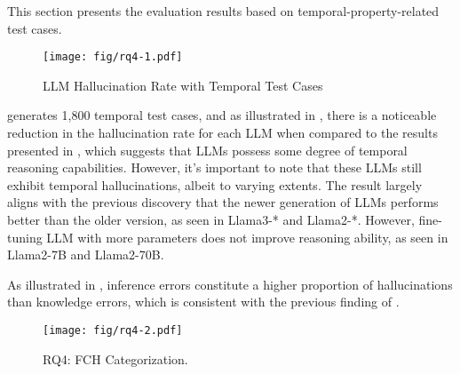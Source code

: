 This section presents the evaluation results based on temporal-property-related test cases. 


\begin{figure}[!b]
\centering
\texttt{[image: fig/rq4-1.pdf]}
\caption{LLM Hallucination Rate with Temporal Test Cases}
\label{fig:rq4-Effectiveness}
\end{figure}


\tool generates 1,800 temporal test cases, and as illustrated in , there is a noticeable reduction in the hallucination rate for each LLM when compared to the results presented in , which suggests that LLMs possess some degree of temporal reasoning capabilities. However, it's important to note that these LLMs still exhibit temporal hallucinations, albeit to varying extents.
The result largely aligns with the previous discovery that the newer generation of LLMs performs better than the older version, as seen in Llama3-* and Llama2-*. However, fine-tuning LLM with more parameters does not improve reasoning ability, as seen in Llama2-7B and Llama2-70B. 



As illustrated in , inference errors constitute a higher proportion of hallucinations than knowledge errors, which is consistent with the previous finding of . 

\begin{figure}[!t]
\centering
\texttt{[image: fig/rq4-2.pdf]}
\caption{RQ4: FCH Categorization.}
\label{fig:rq4-Categorization}
\end{figure}



